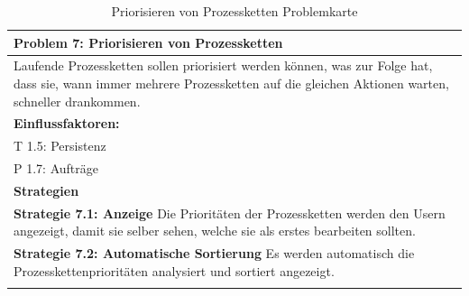 \documentclass[enabledeprecatedfontcommands,fontsize=12pt,paper=a4,twoside]{scrartcl}
\begin{document}
\begin{table}[H]
    \centering
    \begin{tabular}{|p{15cm}|}
    \hline
          \textbf{Problem 7:} Priorisieren von Prozessketten
          \\ \hline
          Laufende Prozessketten sollen priorisiert werden können, was zur Folge hat, dass sie, wann immer mehrere Prozessketten auf die gleichen Aktionen warten, schneller drankommen. 
          \\ \hline
          \textbf{Einflussfaktoren: } \\
          T 1.5: Persistenz \\
          P 1.7: Aufträge \\
          \hline
          \textbf{Strategien} \\ \hline
          \textbf{Strategie 7.1: Anzeige} Die Prioritäten der Prozessketten werden den Usern angezeigt, damit sie selber sehen, welche sie als erstes bearbeiten sollten. \\
          \textbf{Strategie 7.2: Automatische Sortierung} Es werden automatisch die Prozesskettenprioritäten analysiert und sortiert angezeigt. \\
          \\ \hline


    \end{tabular}
    \caption{Priorisieren von Prozessketten Problemkarte}
    \label{tab:ProblemKarte7}
\end{table}
\end{document}
